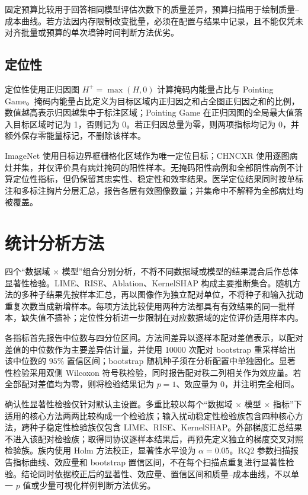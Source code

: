 固定预算比较用于回答相同模型评估次数下的质量差异，预算扫描用于绘制质量--成本曲线。若方法因内存限制改变批量，必须在配置与结果中记录，且不能仅凭未对齐批量或预算的单次墙钟时间判断方法优劣。

\subsection{定位性}

定位性使用正归因图 $H^{+}=\max(H,0)$ 计算掩码内能量占比与 Pointing Game。掩码内能量占比定义为目标区域内正归因之和占全图正归因之和的比例，数值越高表示归因越集中于标注区域；Pointing Game 在正归因图的全局最大值落入目标区域时记为 1，否则记为 0。若正归因总量为零，则两项指标均记为 0，并额外保存零能量标记，不删除该样本。

ImageNet 使用目标边界框栅格化区域作为唯一定位目标；CHNCXR 使用逐图病灶并集，并仅评价具有病灶掩码的阳性样本。无掩码阳性病例和全部阴性病例不计算定位性指标，但仍保留其忠实性、稳定性和效率结果。医学定位结果同时按单标注和多标注胸片分层汇总，报告各层有效图像数量；并集命中不解释为全部病灶均被覆盖。

\section{统计分析方法}

四个“数据域 $\times$ 模型”组合分别分析，不将不同数据域或模型的结果混合后作总体显著性检验。LIME、RISE、Ablation、KernelSHAP 构成主要推断集合。随机方法的多种子结果先按样本汇总，再以图像作为独立配对单位，不将种子和输入扰动重复次数当成新增样本。每项方法比较使用两种方法都具有有效结果的同一批样本，缺失值不插补；定位性分析进一步限制在对应数据域的定位评价适用样本内。

各指标首先报告中位数与四分位区间。方法间差异以逐样本配对差值表示，以配对差值的中位数作为主要差异估计量，并使用 10000 次配对 bootstrap 重采样给出该中位数的 $95\%$ 置信区间；bootstrap 随机种子须在分析配置中单独固化。显著性检验采用双侧 Wilcoxon 符号秩检验，同时报告配对秩二列相关作为效应量。若全部配对差值均为零，则将检验结果记为 $p=1$、效应量为 0，并注明完全相同。

确认性显著性检验仅针对默认主设置。多重比较以每个“数据域 $\times$ 模型 $\times$ 指标”下适用的核心方法两两比较构成一个检验族；输入扰动稳定性检验族包含四种核心方法，跨种子稳定性检验族仅包含 LIME、RISE、KernelSHAP。外部梯度汇总结果不进入该配对检验族；取得同协议逐样本结果后，再预先定义独立的梯度交叉对照检验族。族内使用 Holm 方法校正，显著性水平设为 $\alpha=0.05$。RQ2 参数扫描报告指标曲线、效应量和 bootstrap 置信区间，不在每个扫描点重复进行显著性检验。结论同时依据校正后的显著性、效应量、置信区间和质量--成本曲线，不以单一 $p$ 值或少量可视化样例判断方法优劣。

